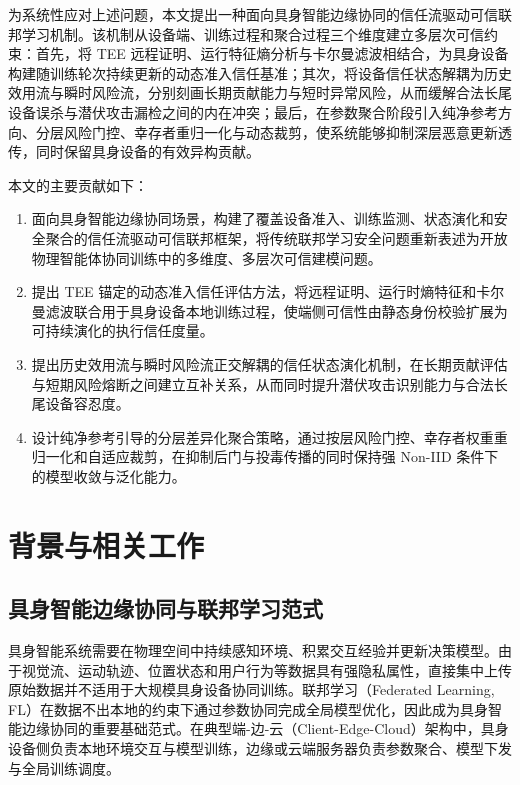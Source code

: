 \documentclass[11pt, a4paper, UTF8, fontset=fandol]{ctexart}
\begin{document}
为系统性应对上述问题，本文提出一种面向具身智能边缘协同的信任流驱动可信联邦学习机制。该机制从设备端、训练过程和聚合过程三个维度建立多层次可信约束：首先，将 TEE 远程证明、运行特征熵分析与卡尔曼滤波相结合，为具身设备构建随训练轮次持续更新的动态准入信任基准；其次，将设备信任状态解耦为历史效用流与瞬时风险流，分别刻画长期贡献能力与短时异常风险，从而缓解合法长尾设备误杀与潜伏攻击漏检之间的内在冲突；最后，在参数聚合阶段引入纯净参考方向、分层风险门控、幸存者重归一化与动态裁剪，使系统能够抑制深层恶意更新透传，同时保留具身设备的有效异构贡献。

本文的主要贡献如下：
\begin{enumerate}
    \item 面向具身智能边缘协同场景，构建了覆盖设备准入、训练监测、状态演化和安全聚合的信任流驱动可信联邦框架，将传统联邦学习安全问题重新表述为开放物理智能体协同训练中的多维度、多层次可信建模问题。
    \item 提出 TEE 锚定的动态准入信任评估方法，将远程证明、运行时熵特征和卡尔曼滤波联合用于具身设备本地训练过程，使端侧可信性由静态身份校验扩展为可持续演化的执行信任度量。
    \item 提出历史效用流与瞬时风险流正交解耦的信任状态演化机制，在长期贡献评估与短期风险熔断之间建立互补关系，从而同时提升潜伏攻击识别能力与合法长尾设备容忍度。
    \item 设计纯净参考引导的分层差异化聚合策略，通过按层风险门控、幸存者权重重归一化和自适应裁剪，在抑制后门与投毒传播的同时保持强 Non-IID 条件下的模型收敛与泛化能力。
\end{enumerate}


\section{背景与相关工作}

\subsection{具身智能边缘协同与联邦学习范式}
具身智能系统需要在物理空间中持续感知环境、积累交互经验并更新决策模型。由于视觉流、运动轨迹、位置状态和用户行为等数据具有强隐私属性，直接集中上传原始数据并不适用于大规模具身设备协同训练。联邦学习（Federated Learning, FL）在数据不出本地的约束下通过参数协同完成全局模型优化，因此成为具身智能边缘协同的重要基础范式。在典型端-边-云（Client-Edge-Cloud）架构中，具身设备侧负责本地环境交互与模型训练，边缘或云端服务器负责参数聚合、模型下发与全局训练调度。
\end{document}
